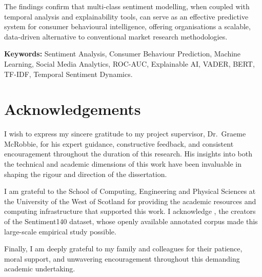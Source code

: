 The findings confirm that multi-class sentiment modelling, when coupled with temporal analysis and explainability tools, can serve as an effective predictive system for consumer behavioural intelligence, offering organisations a scalable, data-driven alternative to conventional market research methodologies.

\vspace{6pt}
\noindent\textbf{Keywords:} Sentiment Analysis, Consumer Behaviour Prediction, Machine Learning, Social Media Analytics, ROC-AUC, Explainable AI, VADER, BERT, TF-IDF, Temporal Sentiment Dynamics.

\chapter*{Acknowledgements}

I wish to express my sincere gratitude to my project supervisor, Dr.\ Graeme McRobbie, for his expert guidance, constructive feedback, and consistent encouragement throughout the duration of this research. His insights into both the technical and academic dimensions of this work have been invaluable in shaping the rigour and direction of the dissertation.

I am grateful to the School of Computing, Engineering and Physical Sciences at the University of the West of Scotland for providing the academic resources and computing infrastructure that supported this work. I acknowledge \citet{go2009twitter}, the creators of the Sentiment140 dataset, whose openly available annotated corpus made this large-scale empirical study possible.

Finally, I am deeply grateful to my family and colleagues for their patience, moral support, and unwavering encouragement throughout this demanding academic undertaking.

\cleardoublepage

